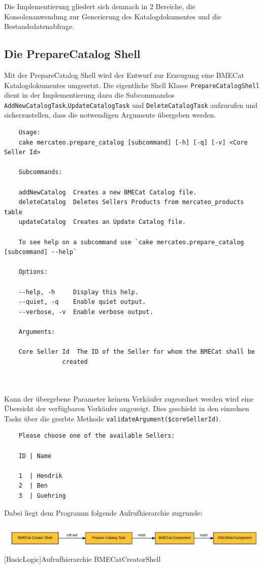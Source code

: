 	Die Implementierung gliedert sich demnach in 2 Bereiche, die Konsolenanwendung zur Generierung des Katalogdokumentes und die Bestandsdatenabfrage.
	
	\subsection{Die PrepareCatalog Shell}
	
	Mit der PrepareCatalog Shell wird der Entwurf zur Erzeugung eine BMECat Katalogdokumentes umgesetzt. Die eigentliche Shell Klasse \texttt{PrepareCatalogShell} dient in der Implementierung  dazu die Subcommandos \texttt{AddNewCatalogTask},\texttt{UpdateCatalogTask} und \texttt{DeleteCatalogTask} aufzurufen und sicherzustellen, dass die notwendigen Argumente übergeben werden.
	\lstset{basicstyle=\scriptsize\ttfamily}
	\begin{lstlisting}
	Usage:
	cake mercateo.prepare_catalog [subcommand] [-h] [-q] [-v] <Core Seller Id>
	
	Subcommands:
	
	addNewCatalog  Creates a new BMECat Catalog file.
	deleteCatalog  Deletes Sellers Products from mercateo_products table
	updateCatalog  Creates an Update Catalog file.
	
	To see help on a subcommand use `cake mercateo.prepare_catalog [subcommand] --help`
	
	Options:
	
	--help, -h     Display this help.
	--quiet, -q    Enable quiet output.
	--verbose, -v  Enable verbose output.
	
	Arguments:
	
	Core Seller Id  The ID of the Seller for whom the BMECat shall be
	            created

	
	\end{lstlisting}
	
	Kann der übergebene Parameter keinem Verkäufer zugeordnet werden wird eine Übersicht der verfügbaren Verkäufer angezeigt. Dies geschieht in den einzelnen Tasks über die geerbte Methode \texttt{validateArgument(\$coreSellerId)}.
	
	\begin{lstlisting}
	Please choose one of the available Sellers:
	
	ID | Name
	
	1  | Hendrik
	2  | Ben
	3  | Guehring
	\end{lstlisting}
	
	Dabei liegt dem Programm folgende Aufrufhierarchie zugrunde:\\
	\begin{minipage}{\linewidth}
		\vspace{1em}
		\centering
		\includegraphics[width=1 \linewidth]{img/shellFlow}
		[BasicLogic]{Aufrufhierarchie BMECatCreatorShell}
		\vspace{1em}
	\end{minipage}\\
	
